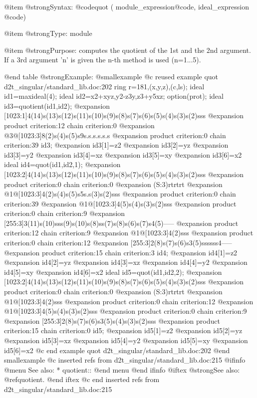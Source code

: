 {{{{{{@item @strong{Syntax:}
@code{quot (} module_expression@code{,} ideal_expression @code{)}

@item @strong{Type:}
module

@item @strong{Purpose:}
computes the quotient of the 1st and the 2nd argument.
If a 3rd argument 'n' is given the n-th method is used
(n=1...5).

@end table
@strong{Example:}
@smallexample
@c reused example quot d2t_singular/standard_lib.doc:202 
  ring r=181,(x,y,z),(c,ls);
ideal id1=maxideal(4);
ideal id2=x2+xyz,y2-z3y,z3+y5xz;
option(prot);
ideal id3=quotient(id1,id2);
@expansion{} [1023:1]4(14)s(13)s(12)s(11)s(10)s(9)s(8)s(7)s(6)s(5)s(4)s(3)s(2)sss
@expansion{} product criterion:12 chain criterion:0
@expansion{} @{3@}[1023:3]8(2)s(4)s(5)s9s.s.s.s.s.s
@expansion{} product criterion:0 chain criterion:39
id3;
@expansion{} id3[1]=z2
@expansion{} id3[2]=yz
@expansion{} id3[3]=y2
@expansion{} id3[4]=xz
@expansion{} id3[5]=xy
@expansion{} id3[6]=x2
ideal id4=quot(id1,id2,1);
@expansion{} [1023:2]4(14)s(13)s(12)s(11)s(10)s(9)s(8)s(7)s(6)s(5)s(4)s(3)s(2)sss
@expansion{} product criterion:0 chain criterion:0
@expansion{} (S:3)rtrtrt
@expansion{} @{1@}[1023:3]4(2)s(4)s(5)s5s.s(3)s(2)sss
@expansion{} product criterion:0 chain criterion:39
@expansion{} @{1@}[1023:3]4(5)s(4)s(3)s(2)sss
@expansion{} product criterion:0 chain criterion:9
@expansion{} [255:3]3(11)s(10)sss(9)s(10)s(8)ss(7)s(8)s(6)s(7)s4(5)-----
@expansion{} product criterion:12 chain criterion:9
@expansion{} @{1@}[1023:3]4(2)sss
@expansion{} product criterion:0 chain criterion:12
@expansion{} [255:3]2(8)s(7)s(6)s3(5)ssssss4-----
@expansion{} product criterion:15 chain criterion:3
id4;
@expansion{} id4[1]=z2
@expansion{} id4[2]=yz
@expansion{} id4[3]=xz
@expansion{} id4[4]=y2
@expansion{} id4[5]=xy
@expansion{} id4[6]=x2
ideal id5=quot(id1,id2,2);
@expansion{} [1023:2]4(14)s(13)s(12)s(11)s(10)s(9)s(8)s(7)s(6)s(5)s(4)s(3)s(2)sss
@expansion{} product criterion:0 chain criterion:0
@expansion{} (S:3)rtrtrt
@expansion{} @{1@}[1023:3]4(2)sss
@expansion{} product criterion:0 chain criterion:12
@expansion{} @{1@}[1023:3]4(5)s(4)s(3)s(2)sss
@expansion{} product criterion:0 chain criterion:9
@expansion{} [255:3]2(8)s(7)s(6)s3(5)s(4)s(3)s(2)sss
@expansion{} product criterion:15 chain criterion:0
id5;
@expansion{} id5[1]=z2
@expansion{} id5[2]=yz
@expansion{} id5[3]=xz
@expansion{} id5[4]=y2
@expansion{} id5[5]=xy
@expansion{} id5[6]=x2
@c end example quot d2t_singular/standard_lib.doc:202
@end smallexample
@c inserted refs from d2t_singular/standard_lib.doc:215
@ifinfo
@menu
See also:
* quotient::
@end menu
@end ifinfo
@iftex
@strong{See also:}
@ref{quotient}.
@end iftex
@c end inserted refs from d2t_singular/standard_lib.doc:215

}}}}}}
